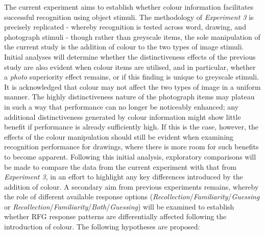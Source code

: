 \documentclass[
  11pt,
]{article}
\begin{document}
The current experiment aims to establish whether colour information
facilitates successful recognition using object stimuli. The methodology
of \emph{Experiment 3} is precisely replicated - whereby recognition is
tested across word, drawing, and photograph stimuli - though rather than
greyscale items, the sole manipulation of the current study is the
addition of colour to the two types of image stimuli. Initial analyses
will determine whether the distinctiveness effects of the previous study
are also evident when colour items are utilised, and in particular,
whether a \emph{photo} superiority effect remains, or if this finding is
unique to greyscale stimuli. It is acknowledged that colour may not
affect the two types of image in a uniform manner. The highly
distinctiveness nature of the photograph items may plateau in such a way
that performance can no longer be noticeably enhanced; any additional
distinctiveness generated by colour information might show little
benefit if performance is already sufficiently high. If this is the
case, however, the effects of the colour manipulation should still be
evident when examining recognition performance for drawings, where there
is more room for such benefits to become apparent. Following this
initial analysis, exploratory comparisons will be made to compare the
data from the current experiment with that from \emph{Experiment 3}, in
an effort to highlight any key differences introduced by the addition of
colour. A secondary aim from previous experiments remains, whereby the
role of different available response options
(\emph{Recollection}/\emph{Familiarity}/\emph{Guessing} or
\emph{Recollection}/\emph{Familiarity}/\emph{Both}/\emph{Guessing}) will
be examined to establish whether RFG response patterns are
differentially affected following the introduction of colour. The
following hypotheses are proposed:
\end{document}
